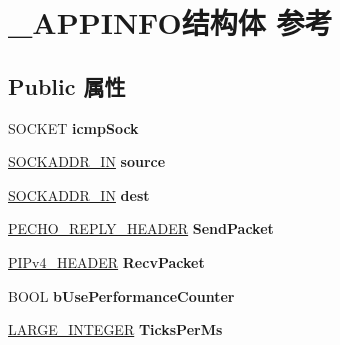 \hypertarget{struct___a_p_p_i_n_f_o}{}\section{\+\_\+\+A\+P\+P\+I\+N\+F\+O结构体 参考}
\label{struct___a_p_p_i_n_f_o}
\subsection*{Public 属性}
\begin{DoxyCompactItemize}
\item 
\mbox{\label{struct___a_p_p_i_n_f_o_a09b6e1a88c83fe09646464832183bb81}} 
S\+O\+C\+K\+ET {\bfseries icmp\+Sock}
\item 
\mbox{\label{struct___a_p_p_i_n_f_o_a29133b17097de99a39a433553c525660}} 
\hyperlink{structsockaddr__in}{S\+O\+C\+K\+A\+D\+D\+R\+\_\+\+IN} {\bfseries source}
\item 
\mbox{\label{struct___a_p_p_i_n_f_o_a78a05d50e4ab442c0dfde5091f29471d}} 
\hyperlink{structsockaddr__in}{S\+O\+C\+K\+A\+D\+D\+R\+\_\+\+IN} {\bfseries dest}
\item 
\mbox{\label{struct___a_p_p_i_n_f_o_a2fb229788aaf87e54aecb88c5289c726}} 
\hyperlink{struct_echo_reply_header}{P\+E\+C\+H\+O\+\_\+\+R\+E\+P\+L\+Y\+\_\+\+H\+E\+A\+D\+ER} {\bfseries Send\+Packet}
\item 
\mbox{\label{struct___a_p_p_i_n_f_o_a645d077fb6d7d70204c04cde4837aec1}} 
\hyperlink{struct_i_pv4_header}{P\+I\+Pv4\+\_\+\+H\+E\+A\+D\+ER} {\bfseries Recv\+Packet}
\item 
\mbox{\label{struct___a_p_p_i_n_f_o_a3bd7e5a6daa16d96427b67a3aea3eba7}} 
B\+O\+OL {\bfseries b\+Use\+Performance\+Counter}
\item 
\mbox{\label{struct___a_p_p_i_n_f_o_a9d9647f79fc954d6bb297c6a757d2f33}} 
\hyperlink{union___l_a_r_g_e___i_n_t_e_g_e_r}{L\+A\+R\+G\+E\+\_\+\+I\+N\+T\+E\+G\+ER} {\bfseries Ticks\+Per\+Ms}
\item 
\mbox{\label{struct___a_p_p_i_n_f_o_adffdeabc7bf3a51e6969e8f9c575325f}} 

\end{DoxyCompactItemize}
